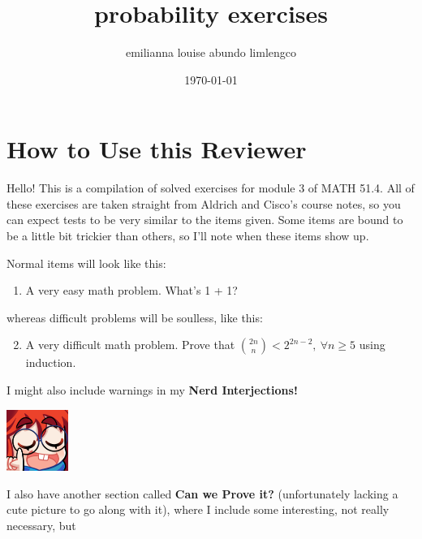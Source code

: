 \documentclass{article}
\title{probability exercises}
\author{emilianna louise abundo limlengco}
\date{\today}
\begin{document}
 

\section*{How to Use this Reviewer}
Hello! This is a compilation of solved exercises for module 3 of MATH 51.4. All of these exercises are taken straight from Aldrich and Cisco's course notes, so you can expect tests 
to be very similar to the items given. Some items are bound to be a little bit trickier than others, so I'll note when these items show up.\par Normal items will look like this:\begin{enumerate} 
    \item A very easy math problem. What's 1 + 1?
\end{enumerate} 
whereas difficult problems will be soulless, like this:\begin{enumerate}\setcounter{enumi}{1}
    \item A very difficult math problem. Prove that $\displaystyle \binom{2n}{n} < 2^{2n-2},~\forall n \geq 5$ using induction. 
\end{enumerate} I might also include warnings in my \textbf{Nerd Interjections!}\par
\parindent=25pt \begin{minipage}[t]{.14\textwidth}
    \vspace{0pt}
    \includegraphics[width=2cm]{nerd_maddy.png}
\end{minipage}%
\parindent=0pt \par I also have another section called \textbf{Can we Prove it?} (unfortunately lacking a cute picture to go along with it), where I include some interesting, not really necessary, but 
\end{document}
